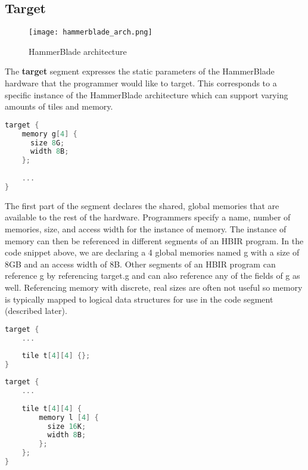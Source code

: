 \documentclass{article}
\begin{document}
\subsection{Target}

\begin{figure}[h]
    \centering
    \texttt{[image: hammerblade\_arch.png]}
    \caption{HammerBlade architecture}
    \label{fig:my_label}
\end{figure}

The \textbf{target} segment expresses the static parameters of the HammerBlade hardware that the programmer would like to target. This corresponds to a specific instance of the HammerBlade architecture which can support varying amounts of tiles and memory. \\

\begin{minipage}[c]{\textwidth}
\begin{lstlisting}[language=C, caption=Global memory instantiation]
target {
    memory g[4] {
      size 8G;
      width 8B;
    };
    
    ...
}
\end{lstlisting}
\end{minipage}

The first part of the segment declares the shared, global memories that are available to the rest of the hardware. Programmers specify a name, number of memories, size, and access width for the instance of memory. The instance of memory can then be referenced in different segments of an HBIR program. In the code snippet above, we are declaring a 4 global memories named g with a size of 8GB and an access width of 8B. Other segments of an HBIR program can reference g by referencing target.g and can also reference any of the fields of g as well. Referencing memory with discrete, real sizes are often not useful so memory is typically mapped to logical data structures for use in the code segment (described later). \\

\begin{minipage}[c]{\textwidth}
\begin{lstlisting}[language=C, caption=Fabric instantiation without local memory]
target {
    ...
    
    tile t[4][4] {};
}
\end{lstlisting}
\end{minipage}

\begin{minipage}[c]{\textwidth}
\begin{lstlisting}[language=C, caption=Fabric instantiation with local memory]
target {
    ...
    
    tile t[4][4] {
        memory l [4] {
          size 16K;
          width 8B;
        };
    };
}
\end{lstlisting}
\end{minipage}
\end{document}

